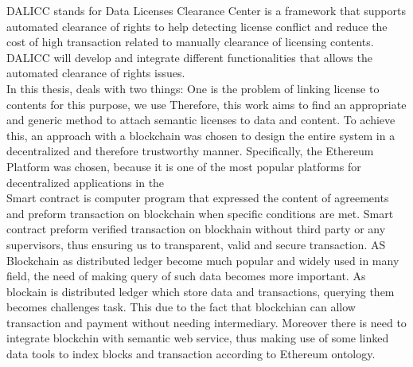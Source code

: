 DALICC stands for Data Licenses Clearance Center is a framework that supports automated clearance of rights to help detecting license conflict and reduce the cost of high transaction related to manually clearance of licensing contents.
DALICC will develop and  integrate different functionalities that allows the automated clearance of rights issues.\\
In this thesis, deals with two things: One is the problem of linking license to contents for this purpose, we use Therefore, this work aims to find an appropriate and
generic method to attach semantic licenses to data and content. To achieve this, an
approach with a blockchain was chosen to design the entire system in a decentralized
and therefore trustworthy manner. Specifically, the Ethereum Platform was chosen,
because it is one of the most popular platforms for decentralized applications in the\\
Smart contract is computer program that expressed the content of agreements and preform transaction on blockchain when specific conditions are met. Smart contract preform verified transaction on blockhain without third party or any supervisors, thus ensuring us to transparent, valid and secure transaction.
AS Blockchain as distributed ledger become much popular and widely used in many field, the need of making query of such data becomes more important.
As blockain is distributed ledger which store data and transactions, querying them becomes challenges task. This due to the fact that blockchian can allow transaction and payment without needing intermediary.
Moreover there is need to integrate blockchin with semantic web service, thus making use of some linked data tools to index blocks and transaction according to Ethereum ontology.  \\
